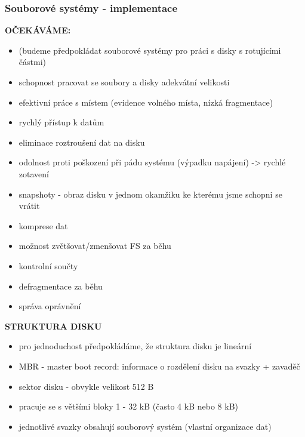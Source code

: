 \documentclass[10pt,a4paper]{article}
\begin{document}
\subsubsection{Souborové systémy - implementace}
\textbf{OČEKÁVÁME:}
\begin{itemize}
	\item (budeme předpokládat souborové systémy pro práci s disky s rotujícími částmi)
	\item schopnost pracovat se soubory a disky adekvátní velikosti
	\item efektivní práce s místem (evidence volného místa, nízká fragmentace)
	\item rychlý přístup k datům
	\item eliminace roztroušení dat na disku
	\item odolnost proti poškození při pádu systému (výpadku napájení) -> rychlé zotavení
	\item snapshoty - obraz disku v jednom okamžiku ke kterému jsme schopni se vrátit
	\item komprese dat
	\item možnost zvětšovat/zmenšovat FS za běhu
	\item kontrolní součty
	\item defragmentace za běhu
	\item správa oprávnění
\end{itemize}

\textbf{STRUKTURA DISKU}
\begin{itemize}
	\item pro jednoduchost předpokládáme, že struktura disku je lineární
	\item MBR - master boot record: informace o rozdělení disku na svazky + zavaděč
	\item sektor disku - obvykle velikost 512 B
	\item pracuje se s většími bloky 1 - 32 kB (často 4 kB nebo 8 kB)
	\item jednotlivé svazky obsahují souborový systém (vlastní organizace dat)
\end{itemize}
\end{document}
